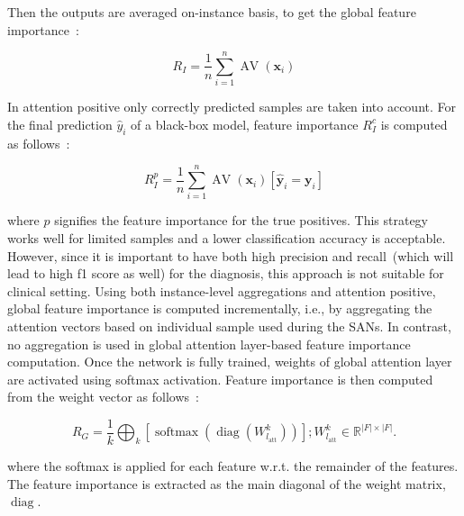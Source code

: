 \hspace*{3.5mm} Then the outputs are averaged on-instance basis, to get the global feature importance~\cite{vskrlj2020feature}: 

\begin{equation}
    R_{I}=\frac{1}{n} \sum_{i=1}^{n} \operatorname{AV}\left(\boldsymbol{x}_{i}\right)
\end{equation}

\hspace*{3.5mm} In attention positive only correctly predicted samples are taken into account. For the final prediction $\hat{y}_{i}$ of a black-box model, feature importance $R_{I}^{c}$ is computed as follows~\cite{vskrlj2020feature}:

\begin{equation}
    R_{I}^{p}=\frac{1}{n} \sum_{i=1}^{n} \operatorname{AV}\left(\boldsymbol{x}_{i}\right)\left[\hat{\boldsymbol{y}}_{i}=\boldsymbol{y}_{i}\right]
\end{equation}

\hspace*{3.5mm} where $p$ signifies the feature importance for the true positives. This strategy works well for limited samples and a lower classification accuracy is acceptable. However, since it is important to have both high precision and recall~(which will lead to high f1 score as well) for the diagnosis, this approach is not suitable for clinical setting. Using both instance-level aggregations and attention positive, global feature importance is computed incrementally, i.e., by aggregating the attention vectors based on individual sample used during the SANs. In contrast, no aggregation is used in global attention layer-based feature importance computation. Once the network is fully trained, weights of global attention layer are activated using softmax activation. Feature importance is then computed from the weight vector as follows~\cite{vskrlj2020feature}:

\begin{equation}
    R_{G}=\frac{1}{k} \bigoplus_{k}\left[\operatorname{softmax}\left(\operatorname{diag}\left(W_{l_{\mathrm{att}}}^{k}\right)\right)\right] ; W_{l_{\mathrm{att}}}^{k} \in \mathbb{R}^{|F| \times|F|}.
    \label{eq:gal_k}
\end{equation}

\hspace*{3.5mm} where the softmax is applied for each feature w.r.t. the remainder of the features. The feature importance is extracted as the main diagonal of the weight matrix, $\operatorname{diag}$. 

